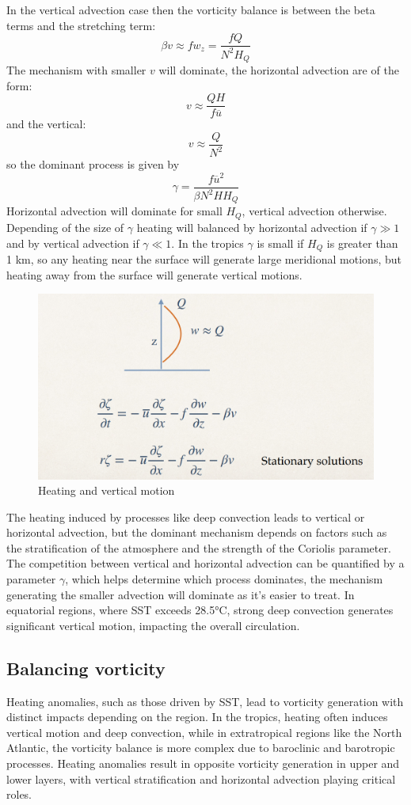 In the vertical advection case then the vorticity balance is between the beta terms and the stretching term:
$$\beta v\approx fw_z=\frac{fQ}{N^2H_Q}$$
The mechanism with smaller $v$ will dominate, the horizontal advection are of the form:
$$v\approx\frac{QH}{f\overline{u}}$$
and the vertical:
$$v\approx\frac{Q}{N^2}$$
so the dominant process is given by
\begin{equation}
	\gamma=\frac{f\overline{u}^2}{\beta N^2HH_Q}
\end{equation}
Horizontal advection will dominate for small $H_Q$, vertical
advection otherwise. Depending of the size of $\gamma$ heating will balanced by horizontal advection if $\gamma \gg 1$ and by vertical advection if $\gamma\ll 1$.
In the tropics $\gamma$ is small if $H_Q$ is greater than 1 km, so any heating near the surface will generate large meridional motions, but heating away from the surface will generate vertical motions.
\begin{figure}[htp!]
	\centering
	\includegraphics[width=0.5\linewidth]{upload/Screenshot 2024-11-26 105240.png}
	\caption{Heating and vertical motion}

\end{figure}


The heating induced by processes like deep convection leads to vertical or horizontal advection, but the dominant mechanism depends on factors such as the stratification of the atmosphere and the strength of the Coriolis parameter. The competition between vertical and horizontal advection can be quantified by a parameter $\gamma$, which helps determine which process dominates, the mechanism generating the smaller advection will dominate as it's easier to treat. In equatorial regions, where SST exceeds 28.5°C, strong deep convection generates significant vertical motion, impacting the overall circulation.

\subsection{Balancing vorticity}
Heating anomalies, such as those driven by SST, lead to vorticity generation with distinct impacts depending on the region. In the tropics, heating often induces vertical motion and deep convection, while in extratropical regions like the North Atlantic, the vorticity balance is more complex due to baroclinic and barotropic processes. Heating anomalies result in opposite vorticity generation in upper and lower layers, with vertical stratification and horizontal advection playing critical roles.

